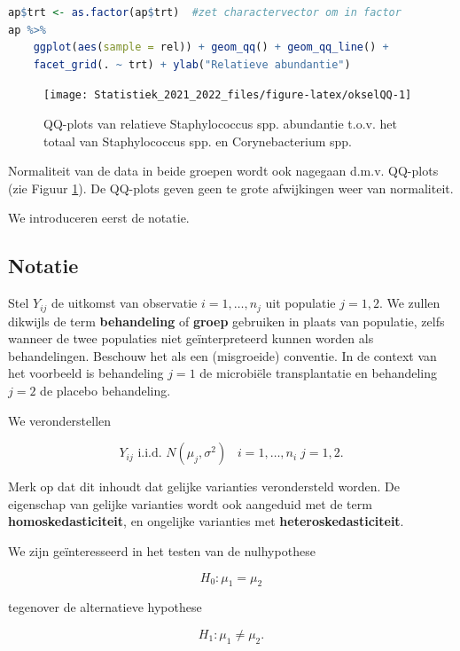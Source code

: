 \documentclass[
  12pt,dutch,coursenotes]{book}
\theoremstyle{definition}
\theoremstyle{definition}
\theoremstyle{definition}
\theoremstyle{definition}
\theoremstyle{remark}
\begin{document}
\begin{lstlisting}[language=R]
ap$trt <- as.factor(ap$trt)  #zet charactervector om in factor
ap %>%
    ggplot(aes(sample = rel)) + geom_qq() + geom_qq_line() +
    facet_grid(. ~ trt) + ylab("Relatieve abundantie")
\end{lstlisting}

\begin{figure}

{\centering \texttt{[image: Statistiek\_2021\_2022\_files/figure-latex/okselQQ-1]} 

}

\caption{QQ-plots van relatieve Staphylococcus spp. abundantie t.o.v. het totaal van Staphylococcus spp. en Corynebacterium spp.}\label{fig:okselQQ}
\end{figure}

Normaliteit van de data in beide groepen wordt ook nagegaan d.m.v. QQ-plots (zie Figuur \ref{fig:okselQQ}). De QQ-plots geven geen te grote afwijkingen weer van normaliteit.

We introduceren eerst de notatie.

\hypertarget{notatie}{%
\subsection{Notatie}\label{notatie}}

Stel \(Y_{ij}\) de uitkomst van observatie \(i=1,\ldots, n_j\) uit populatie \(j=1,2\). We zullen dikwijls de term \textbf{behandeling} of \textbf{groep} gebruiken in plaats van populatie, zelfs wanneer de twee populaties niet geïnterpreteerd kunnen worden als behandelingen. Beschouw het als een (misgroeide) conventie. In de context van het voorbeeld is behandeling \(j=1\) de microbiële transplantatie en behandeling \(j=2\) de placebo behandeling.

We veronderstellen

\[Y_{ij}\text{ i.i.d. } N(\mu_j,\sigma^2)\;\;\;i=1,\ldots,n_i\;j=1,2.\]

Merk op dat dit inhoudt dat gelijke varianties verondersteld worden. De eigenschap van gelijke varianties wordt ook aangeduid met de term \textbf{homoskedasticiteit}, en ongelijke varianties met \textbf{heteroskedasticiteit}.

We zijn geïnteresseerd in het testen van de nulhypothese

\[ H_0: \mu_1 = \mu_2 \]

tegenover de alternatieve hypothese

\[  H_1: \mu_1 \neq \mu_2 .\]
\end{document}
